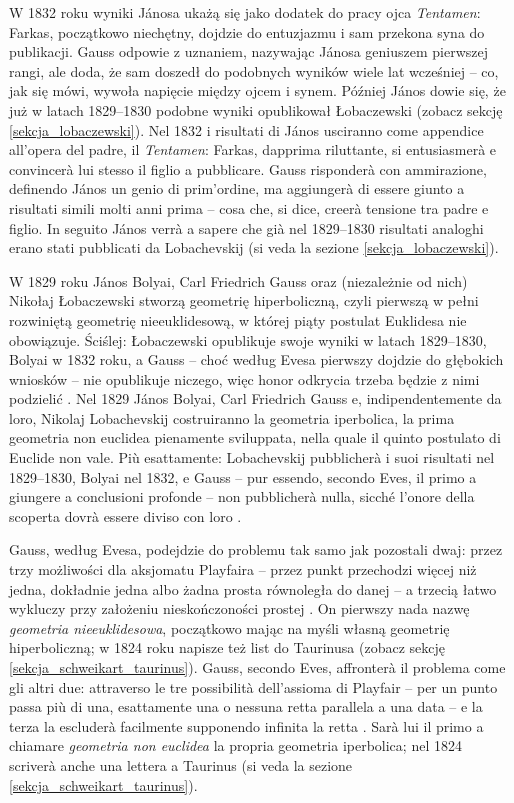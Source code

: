 W 1832 roku wyniki Jánosa ukażą się jako dodatek do pracy ojca \emph{Tentamen}: Farkas, początkowo niechętny, dojdzie do entuzjazmu i sam przekona syna do publikacji. %
Gauss odpowie z uznaniem, nazywając Jánosa geniuszem pierwszej rangi, ale doda, że sam doszedł do podobnych wyników wiele lat wcześniej -- co, jak się mówi, wywoła napięcie między ojcem i synem. %
Później János dowie się, że już w latach 1829--1830 podobne wyniki opublikował Łobaczewski (zobacz sekcję \ref{sekcja_lobaczewski}). %
Nel 1832 i risultati di János usciranno come appendice all'opera del padre, il \emph{Tentamen}: Farkas, dapprima riluttante, si entusiasmerà e convincerà lui stesso il figlio a pubblicare. %
Gauss risponderà con ammirazione, definendo János un genio di prim'ordine, ma aggiungerà di essere giunto a risultati simili molti anni prima -- cosa che, si dice, creerà tensione tra padre e figlio. %
In seguito János verrà a sapere che già nel 1829--1830 risultati analoghi erano stati pubblicati da Lobachevskij (si veda la sezione \ref{sekcja_lobaczewski}). %

W 1829 roku János Bolyai, Carl Friedrich Gauss oraz (niezależnie od nich) Nikołaj Łobaczewski stworzą geometrię hiperboliczną, czyli pierwszą w pełni rozwiniętą geometrię nieeuklidesową, w której piąty postulat Euklidesa nie obowiązuje. %
Ściślej: Łobaczewski opublikuje swoje wyniki w latach 1829--1830, Bolyai w 1832 roku, a Gauss -- choć według Evesa pierwszy dojdzie do głębokich wniosków -- nie opublikuje niczego, więc honor odkrycia trzeba będzie z nimi podzielić \cite[s. 287]{eves1_1972}. %
Nel 1829 János Bolyai, Carl Friedrich Gauss e, indipendentemente da loro, Nikolaj Lobachevskij costruiranno la geometria iperbolica, la prima geometria non euclidea pienamente sviluppata, nella quale il quinto postulato di Euclide non vale. %
Più esattamente: Lobachevskij pubblicherà i suoi risultati nel 1829--1830, Bolyai nel 1832, e Gauss -- pur essendo, secondo Eves, il primo a giungere a conclusioni profonde -- non pubblicherà nulla, sicché l'onore della scoperta dovrà essere diviso con loro \cite[p. 287]{eves1_1972}. %

Gauss, według Evesa, podejdzie do problemu tak samo jak pozostali dwaj: przez trzy możliwości dla aksjomatu Playfaira -- przez punkt przechodzi więcej niż jedna, dokładnie jedna albo żadna prosta równoległa do danej -- a trzecią łatwo wykluczy przy założeniu nieskończoności prostej \cite[s. 287]{eves1_1972}. %
On pierwszy nada nazwę \emph{geometria nieeuklidesowa}, początkowo mając na myśli własną geometrię hiperboliczną; w 1824 roku napisze też list do Taurinusa (zobacz sekcję \ref{sekcja_schweikart_taurinus}). %
Gauss, secondo Eves, affronterà il problema come gli altri due: attraverso le tre possibilità dell'assioma di Playfair -- per un punto passa più di una, esattamente una o nessuna retta parallela a una data -- e la terza la escluderà facilmente supponendo infinita la retta \cite[p. 287]{eves1_1972}. %
Sarà lui il primo a chiamare \emph{geometria non euclidea} la propria geometria iperbolica; nel 1824 scriverà anche una lettera a Taurinus (si veda la sezione \ref{sekcja_schweikart_taurinus}). %

